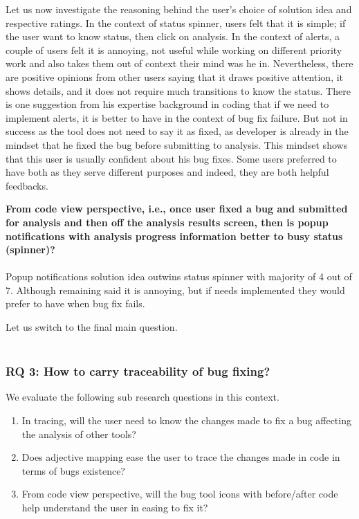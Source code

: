 Let us now investigate the reasoning behind the user’s choice of solution idea and respective ratings. In the context of status spinner, users felt that it is simple; if the user want to know status, then click on analysis. In the context of alerts, a couple of users felt it is annoying, not useful while working on different priority work and also takes them out of context their mind was he in. Nevertheless, there are positive opinions from other users saying that it draws positive attention, it shows details, and it does not require much transitions to know the status. There is one suggestion from his expertise background in coding that if we need to implement alerts, it is better to have in the context of bug fix failure. But not in success as the tool does not need to say it as fixed, as developer is already in the mindset that he fixed the bug before submitting to analysis. This mindset shows that this user is usually confident about his bug fixes. Some users preferred to have both as they serve different purposes and indeed, they are both helpful feedbacks. \\

\begin{myboxi}{{\textbf{From code view perspective, i.e., once user fixed a bug and submitted for analysis and then off the analysis results screen, then is popup notifications with analysis progress information better to busy status (spinner)?}}}
\\ \\	Popup notifications solution idea outwins status spinner with majority of 4 out of 7. Although remaining said it is annoying, but if needs implemented they would prefer to have when bug fix fails.
\end{myboxi}

Let us switch to the final main question. \\ \\

\subsubsection{RQ 3: How to carry traceability of bug fixing?}

We evaluate the following sub research questions in this context. \\

\begin{enumerate}
\item In tracing, will the user need to know the changes made to fix a bug affecting the analysis of other tools?
\item Does adjective mapping ease the user to trace the changes made in code in terms of bugs existence?
\item From code view perspective, will the bug tool icons with before/after code help understand the user in easing to fix it?
\end{enumerate}

